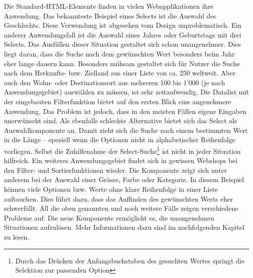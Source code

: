 Die Standard-HTML-Elemente finden in vielen Webapplikationen ihre Anwendung. 
Das bekannteste Beispiel eines Selects ist die Auswahl des Geschlechts. 
Diese Verwendung ist abgesehen vom Design unproblematisch. 
Ein anderer Anwendungsfall ist die Auswahl eines Jahres oder Geburtstags mit drei Selects. 
Das Ausfüllen dieser Situation gestaltet sich schon unangenehmer. 
Dies liegt daran, dass die Suche nach dem gewünschten Wert besonders beim Jahr eher lange dauern kann. 
Besonders mühsam gestaltet sich für Nutzer die Suche nach dem Herkunfts- bzw. Zielland aus einer Liste von ca. 250 weltweit. 
Aber auch den Wohn- oder Destinationsort aus mehreren 100 bis 1'000 (je nach Anwendungsgebiet) auswählen zu müssen, ist sehr zeitaufwendig. 
Die Datalist mit der eingebauten Filterfunktion bietet auf den ersten Blick eine angenehmere Anwendung. 
Das Problem ist jedoch, dass in den meisten Fällen eigene Eingaben unerwünscht sind. 
Als ebenfalls schlechte Alternative bietet sich das Select als Auswahlkomponente an. 
Damit zieht sich die Suche nach einem bestimmten Wert in die Länge – speziell wenn die Optionen nicht in alphabetischer Reihenfolge vorliegen. 
Selbst die Zuhilfenahme der Select-Suche\footnote{
    Durch das Drücken der Anfangsbuchstaben des gesuchten Wertes springt die Selektion zur passenden Option
} ist nicht in jeder Situation hilfreich. 
Ein weiteres Anwendungsgebiet findet sich in gewissen Webshops bei den Filter- und Sortierfunktionen wieder. 
Die Komponente zeigt sich unter anderem bei der Auswahl einer Grösse, Farbe oder Kategorie. 
In diesem Beispiel können viele Optionen bzw. Werte ohne klare Reihenfolge in einer Liste auftauchen. 
Dies führt dazu, dass das Auffinden des gewünschten Werts eher schwerfällt. 
All die oben genannten und noch weitere Fälle zeigen verschiedene Probleme auf. 
Die neue Komponente ermöglicht es, die unangenehmen Situationen aufzulösen. 
Mehr Informationen dazu sind im nachfolgenden Kapitel zu lesen. 
